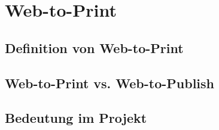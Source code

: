 \chapter{Web-to-Print} \label{web2print}

\section{Definition von Web-to-Print} \label{w2p:Definition}

\section{Web-to-Print vs. Web-to-Publish} \label{w2p:Vergleich}

\section{Bedeutung im Projekt} \label{w2p:Projekt}